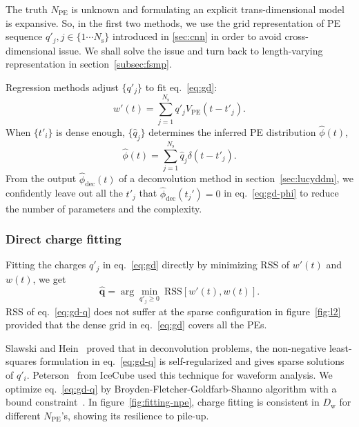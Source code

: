 The truth $N_\mathrm{PE}$ is unknown and formulating an explicit trans-dimensional model is expansive.  So, in the first two methods, we use the grid representation of PE sequence $q'_j, j\in \{1\cdots N_\mathrm{s}\}$ introduced in \ref{sec:cnn} in order to avoid cross-dimensional issue.  We shall solve the issue and turn back to length-varying representation in section~\ref{subsec:fsmp}.

Regression methods adjust $\{q'_j\}$ to fit eq.~\eqref{eq:gd}:
\begin{equation}
  \label{eq:gd}
  w'(t) = \sum_{j=1}^{N_\mathrm{s}}q'_jV_\mathrm{PE}(t-t'_j).
\end{equation}
When $\{t'_i\}$ is dense enough, $\{\hat{q}_j\}$ determines the inferred PE distribution $\hat{\phi}(t)$,
\begin{equation}
  \label{eq:gd-phi}
  \hat{\phi}(t) = \sum_{j=1}^{N_\mathrm{s}}\hat{q}_j\delta(t-t'_j).
\end{equation}
From the output $\hat{\phi}_\mathrm{dec}(t)$ of a deconvolution method in section~\ref{sec:lucyddm}, we confidently leave out all the $t'_j$ that $\hat{\phi}_\mathrm{dec}(t_j')=0$ in eq.~\eqref{eq:gd-phi} to reduce the number of parameters and the complexity.

\subsubsection{Direct charge fitting}
\label{sec:dcf}

Fitting the charges $q'_j$ in eq.~\eqref{eq:gd} directly by minimizing RSS of $w'(t)$ and $w(t)$, we get
\begin{equation}
  \label{eq:gd-q}
  \bm{\hat{q}} = \arg \underset{q'_j \ge 0}{\min}~\mathrm{RSS}\left[w'(t),w(t)\right].
\end{equation}
RSS of eq.~\eqref{eq:gd-q} does not suffer at the sparse configuration in figure~\ref{fig:l2} provided that the dense grid in eq.~\eqref{eq:gd} covers all the PEs.

Slawski and Hein~\cite{slawski_non-negative_2013} proved that in deconvolution problems, the non-negative least-squares formulation in eq.~\eqref{eq:gd-q} is self-regularized and gives sparse solutions of $q'_i$.  Peterson~\cite{peterson_developments_2021} from IceCube used this technique for waveform analysis.  We optimize eq.~\eqref{eq:gd-q} by Broyden-Fletcher-\allowbreak{}Goldfarb-Shanno algorithm with a bound constraint~\cite{byrd_limited_1995}.  In figure~\ref{fig:fitting-npe}, charge fitting is consistent in $D_\mathrm{w}$ for different $N_\mathrm{PE}$'s, showing its resilience to pile-up.

